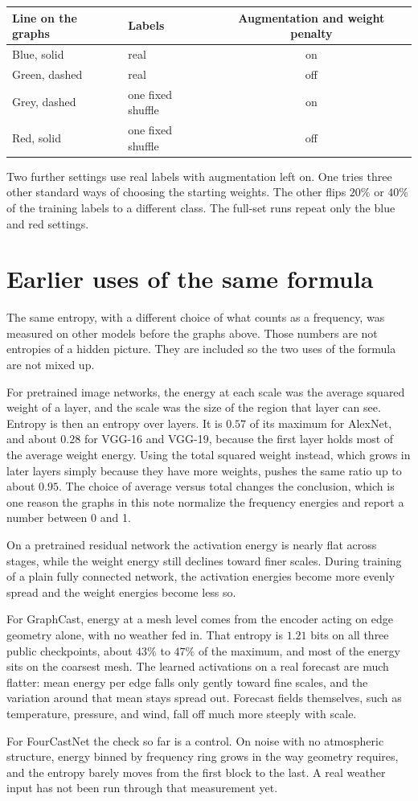 \documentclass[11pt,a4paper]{article}
\begin{document}
\begin{center}
\small
\begin{tabular}{@{}llc@{}}
\toprule
Line on the graphs & Labels & Augmentation and weight penalty \\
\midrule
Blue, solid & real & on \\
Green, dashed & real & off \\
Grey, dashed & one fixed shuffle & on \\
Red, solid & one fixed shuffle & off \\
\bottomrule
\end{tabular}
\end{center}

Two further settings use real labels with augmentation left on. One tries three other standard ways of choosing the starting weights. The other flips \(20\%\) or \(40\%\) of the training labels to a different class. The full-set runs repeat only the blue and red settings.

\section{Earlier uses of the same formula}

The same entropy, with a different choice of what counts as a frequency, was measured on other models before the graphs above. Those numbers are not entropies of a hidden picture. They are included so the two uses of the formula are not mixed up.

For pretrained image networks, the energy at each scale was the average squared weight of a layer, and the scale was the size of the region that layer can see. Entropy is then an entropy over layers. It is \(0.57\) of its maximum for AlexNet, and about \(0.28\) for VGG-16 and VGG-19, because the first layer holds most of the average weight energy. Using the total squared weight instead, which grows in later layers simply because they have more weights, pushes the same ratio up to about \(0.95\). The choice of average versus total changes the conclusion, which is one reason the graphs in this note normalize the frequency energies and report a number between 0 and 1.

On a pretrained residual network the activation energy is nearly flat across stages, while the weight energy still declines toward finer scales. During training of a plain fully connected network, the activation energies become more evenly spread and the weight energies become less so.

For GraphCast, energy at a mesh level comes from the encoder acting on edge geometry alone, with no weather fed in. That entropy is \(1.21\) bits on all three public checkpoints, about \(43\%\) to \(47\%\) of the maximum, and most of the energy sits on the coarsest mesh. The learned activations on a real forecast are much flatter: mean energy per edge falls only gently toward fine scales, and the variation around that mean stays spread out. Forecast fields themselves, such as temperature, pressure, and wind, fall off much more steeply with scale.

For FourCastNet the check so far is a control. On noise with no atmospheric structure, energy binned by frequency ring grows in the way geometry requires, and the entropy barely moves from the first block to the last. A real weather input has not been run through that measurement yet.
\end{document}

